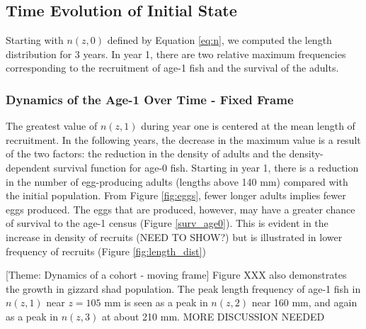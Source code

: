 \documentclass[preprint,review,12pt,authoryear]{elsarticle}
\begin{document}
\subsection{Time Evolution of Initial State}
Starting with $n(z,0)$ defined by Equation \ref{eq:n}, we computed the length distribution for 3 years.  In year 1, there are two relative maximum frequencies corresponding to the recruitment of age-1 fish and the survival of the adults.
\subsubsection{Dynamics of the Age-1 Over Time - Fixed Frame}
 The greatest value of $n(z,1)$ during year one is centered at the mean length of recruitment. In the following years, the decrease in the maximum value is a result of the two factors:  the reduction in the density of adults and the density-dependent survival function for age-0 fish. Starting in year 1, there is a reduction in the number of egg-producing adults (lengths above 140 mm) compared with the initial population.  From Figure \ref{fig:eggs}, fewer longer adults implies fewer eggs produced.  The eggs that are produced, however, may have a greater chance of survival to the age-1 census (Figure \ref{surv_age0}).   This is evident in the increase in density of recruits (NEED TO SHOW?) but is illustrated in lower frequency of recruits (Figure \ref{fig:length_dist}) 




[Theme: Dynamics of a cohort - moving frame]
Figure XXX also demonstrates the growth in gizzard shad population.  The peak length frequency of age-1 fish in $n(z,1)$ near $z = 105$ mm is seen as a peak in $n(z,2)$ near 160 mm, and again as a peak in $n(z,3)$ at about 210 mm.  MORE DISCUSSION NEEDED
\end{document}
